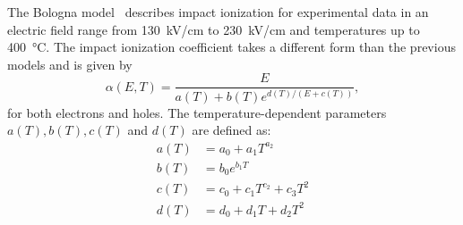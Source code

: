 The Bologna model~\cite{bologna} describes impact ionization for experimental data in an electric field range from \SI{130}{kV/cm} to \SI{230}{kV/cm} and temperatures up to \SI{400}{\celsius}.
The impact ionization coefficient takes a different form than the previous models and is given by
\begin{equation}
    \label{eq:multi:bologna}
    \alpha (E, T) = \frac{E}{a(T) + b(T) e^{d(T) / \left(E + c(T) \right)}},
\end{equation}
for both electrons and holes.
The temperature-dependent parameters $a(T), b(T), c(T)$ and $d(T)$ are defined as:
\begin{equation}
    \begin{split}
        a(T) &= a_{0} + a_1 T^{a_2}\\
        b(T) &= b_{0} e^{b_1 T}\\
        c(T) &= c_{0} + c_1 T^{c_2} + c_3 T^{2}\\
        d(T) &= d_{0} + d_1 T + d_2 T^{2}
    \end{split}
\end{equation}

